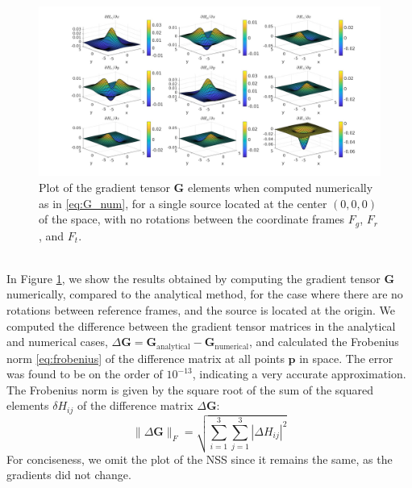 \documentclass[main]{subfiles}
\begin{document}
\begin{figure}
\centering
\hspace*{-0.2\textwidth}
\includegraphics[width=1.4\textwidth]{images/gradients_single_num.jpg}
\caption{Plot of the gradient tensor \( \mathbf{G} \) elements
when computed numerically as in \ref{eq:G_num}, for a single source located
at the center \( (0,0,0) \) of the space, with no rotations between the coordinate
frames \( F_g \), \( F_r \), and \( F_t \).}
\label{fig:gradients_single_num}
\end{figure}

\noindent\\
In Figure \ref{fig:gradients_single_num}, we show the results obtained by computing the 
gradient tensor \( \mathbf{G} \) numerically, compared to the analytical method, 
for the case where there are no rotations between reference frames, and the source is located 
at the origin. We computed the difference between the gradient tensor matrices 
in the analytical and numerical cases, \( \Delta \mathbf{G} = \mathbf{G}_{\text{analytical}} - \mathbf{G}_{\text{numerical}} \), 
and calculated the Frobenius norm \eqref{eq:frobenius} of the difference matrix at all points \( \mathbf{p} \) in space.
The error was found to be on the order of \( 10^{-13} \), indicating a very accurate approximation.
The Frobenius norm is given by the square root of the sum of the squared elements \( \delta H_{ij} \) 
of the difference matrix \( \Delta \mathbf{G} \):
\begin{equation}
    \|\Delta \mathbf{G}\|_F = \sqrt{\sum_{i=1}^3 \sum_{j=1}^3 |\Delta H_{ij}|^2}
    \label{eq:frobenius}
\end{equation}
For conciseness, we omit the plot of the NSS since it remains the same, 
as the gradients did not change.
    
\end{document}
